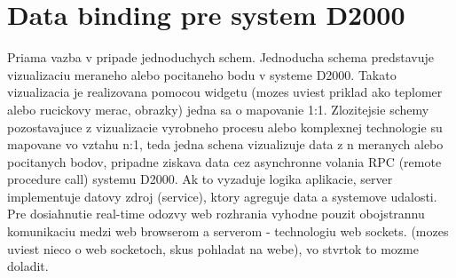 \section{Data binding pre system D2000}
Priama vazba v pripade jednoduchych schem. Jednoducha schema predstavuje vizualizaciu meraneho alebo pocitaneho bodu v systeme D2000. Takato vizualizacia je realizovana pomocou widgetu
(mozes uviest priklad ako teplomer alebo rucickovy merac, obrazky) jedna sa o mapovanie 1:1.
Zlozitejsie schemy pozostavajuce z vizualizacie vyrobneho procesu alebo komplexnej technologie su mapovane vo vztahu n:1, teda jedna schena vizualizuje data z n meranych alebo pocitanych bodov,
pripadne ziskava data cez asynchronne volania RPC (remote procedure call) systemu D2000.
Ak to vyzaduje logika aplikacie, server implementuje datovy zdroj (service), ktory agreguje data a systemove udalosti. Pre dosiahnutie real-time odozvy web rozhrania vyhodne pouzit obojstrannu
komunikaciu medzi web browserom a serverom - technologiu web sockets. (mozes uviest nieco o web socketoch, skus pohladat na webe), vo stvrtok to mozme doladit.



